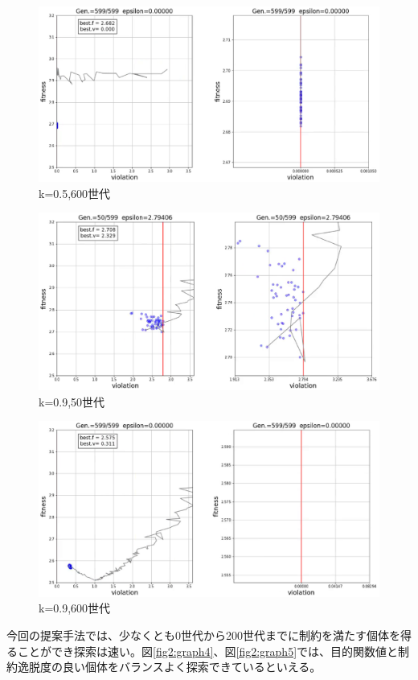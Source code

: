 \documentclass[twocolumn,10pt]{jarticle}
\begin{document}
\begin{figure}[htbp]
  \centering
  \includegraphics[width=.9\linewidth]{fig2/top_rate=0.5,600.eps}
  \caption{k=0.5,600世代}
\label{fig2:graph7}
\end{figure}
\begin{figure}[htbp]
  \centering
  \includegraphics[width=.9\linewidth]{fig2/top_rate=0.9,50.eps}
  \caption{k=0.9,50世代}
\label{fig2:graph8}
\end{figure}
\begin{figure}[htbp]
  \centering
  \includegraphics[width=.9\linewidth]{fig2/top_rate=0.9,600.eps}
  \caption{k=0.9,600世代}
\label{fig2:graph9}
\end{figure}
今回の提案手法では、少なくとも0世代から200世代までに制約を満たす個体を得ることができ探索は速い。図\ref{fig2:graph4}、図\ref{fig2:graph5}では、目的関数値と制約逸脱度の良い個体をバランスよく探索できているといえる。
\end{document}
